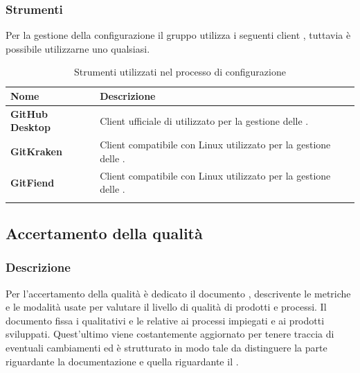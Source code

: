 {{\subsubsection{Strumenti}
Per la gestione della configurazione il gruppo utilizza i seguenti client , tuttavia è possibile utilizzarne uno qualsiasi.
\setlength{\freewidth}{\dimexpr\textwidth-0\tabcolsep}
	\renewcommand{\arraystretch}{1.5}
	\setlength{\aboverulesep}{0pt}
	\setlength{\belowrulesep}{0pt}
	\begin{longtable}{L{.30\freewidth} L{.60\freewidth}}
		\textbf{Nome} & \textbf{Descrizione} \\
		\toprule
		\endhead
		\textbf{GitHub Desktop} & Client ufficiale di  utilizzato per la gestione delle  . \\
		\textbf{GitKraken} & Client compatibile con Linux utilizzato per la gestione delle  . \\
		\textbf{GitFiend} & Client compatibile con Linux utilizzato per la gestione delle  . \\
		\bottomrule
		\hiderowcolors
		\caption{Strumenti utilizzati nel processo di configurazione}
	\end{longtable}


\subsection{Accertamento della qualità}
\subsubsection{Descrizione}
Per l'accertamento della qualità è dedicato il documento \PdQ{}, descrivente le metriche e le modalità usate per valutare il livello di qualità di prodotti e processi. Il documento fissa i  qualitativi e le  relative ai processi impiegati e ai prodotti sviluppati. Quest'ultimo viene costantemente aggiornato per tenere traccia di eventuali cambiamenti ed è strutturato in modo tale da distinguere la parte riguardante la documentazione e quella riguardante il .

}}
